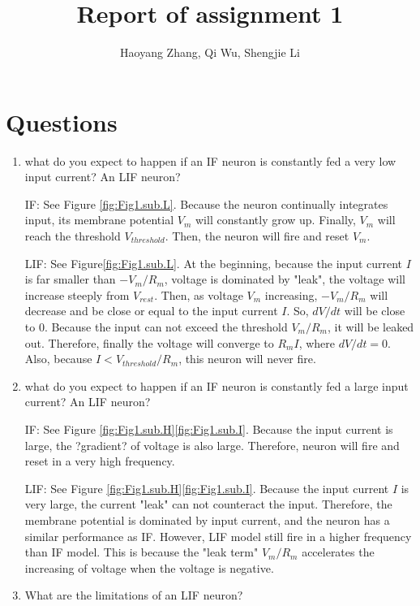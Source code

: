 \documentclass[11pt]{article}
\title{Report of assignment 1}
\author{Haoyang Zhang, Qi Wu, Shengjie Li}
\begin{document}
\maketitle

	\section*{Questions}
	\begin{enumerate}
		\item what do you expect to happen if an IF neuron is constantly fed a very low input current? An LIF neuron?
		
		IF: See Figure \ref{fig:Fig1.sub.L}. Because the neuron continually integrates input, its membrane potential $V_m$ will constantly grow up. Finally, $V_m$ will reach the threshold $V_{threshold}$. Then, the neuron will fire and reset $V_m$.
		
		LIF: See Figure\ref{fig:Fig1.sub.L}. At the beginning, because the input current $I$ is far smaller than $-V_m/R_m$, voltage is dominated by "leak", the voltage will increase steeply from $V_{rest}$. Then, as voltage $V_m$ increasing, $-V_m/R_m$ will decrease and be close or equal to the input current $I$. So, $dV/dt$ will be close to 0. Because the input can not exceed the threshold $V_m/R_m$, it will be leaked out. Therefore, finally the voltage will converge to $R_mI$, where $dV/dt = 0$. Also, because $I < V_{threshold}/R_m$, this neuron will never fire.
		
		\item what do you expect to happen if an IF neuron is constantly fed a large input current? An LIF neuron?
			
		IF: See Figure \ref{fig:Fig1.sub.H}\ref{fig:Fig1.sub.I}. Because the input current is large, the ?gradient? of voltage is also large. Therefore, neuron will fire and reset in a very high frequency.
		
		LIF: See Figure \ref{fig:Fig1.sub.H}\ref{fig:Fig1.sub.I}. Because the input current $I$ is very large, the current "leak" can not counteract the input. Therefore, the membrane potential is dominated by input current, and the neuron has a similar performance as IF. However, LIF model still fire in a higher frequency than IF model. This is because the "leak term" $V_m/R_m$ accelerates the increasing of voltage when the voltage is negative.
		
		\item What are the limitations of an LIF neuron?
			

\end{enumerate}
\end{document}
